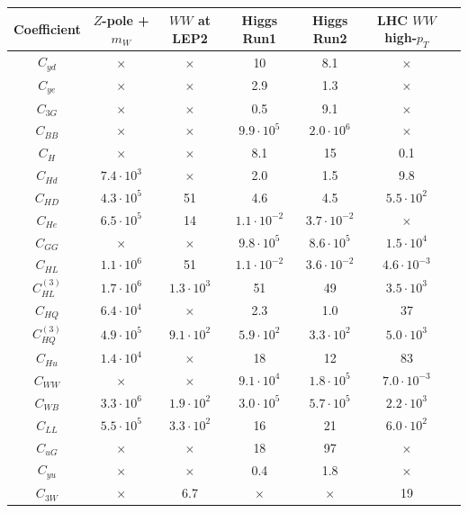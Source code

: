 \documentclass[../report.tex]{subfiles}
\begin{document}
\begin{table}
\centering
 \begin{tabular}{|c|c|c|c|c|c|c|} \hline
Coefficient & $Z$-pole + $m_W$ & $WW$ at LEP2 & Higgs Run1 & Higgs Run2 & LHC $WW$ high-$p_T$  \\  \hline \hline
 $C_{yd}$ & $\times$ & $\times$ & 10 & 8.1 & $\times$  \\
 $C_{ye}$ & $\times$ & $\times$ & 2.9 & 1.3 & $\times$ \\
 $C_{3G}$ & $\times$ & $\times$ & 0.5 & 9.1 & $\times$  \\
 $C_{BB}$ & $\times$ & $\times$ & $9.9 \cdot 10^5$ & $2.0 \cdot 10^6$ & $\times$  \\
 $C_{H}$ & $\times$ & $\times$ & 8.1 & 15 & 0.1  \\
$C_{Hd}$ & $7.4 \cdot 10^3$ & $\times$ & 2.0 & 1.5 & 9.8  \\
 $C_{HD}$ & $4.3 \cdot 10^5$ & 51 & 4.6 & 4.5 & $5.5 \cdot 10^2$  \\
$C_{He}$ & $6.5 \cdot 10^5$ & 14 & $1.1 \cdot 10^{-2}$ & $3.7 \cdot 10^{-2}$ & $\times$  \\
 $C_{GG}$ & $\times$ & $\times$ & $9.8 \cdot 10^5$ & $8.6 \cdot 10^5$ & $1.5 \cdot 10^4$  \\
$C_{HL}$ & $1.1 \cdot 10^6$ & 51 & $1.1 \cdot 10^{-2}$ & $3.6 \cdot 10^{-2}$ & $4.6 \cdot 10^{-3}$  \\
 $C_{HL}^{(3)}$ & $1.7 \cdot 10^6$ & $1.3 \cdot 10^3$ & 51 & 49 & $3.5 \cdot 10^3$  \\
 $C_{HQ}$ & $6.4 \cdot 10^4$ & $\times$ & 2.3 & 1.0 & 37  \\
$C_{HQ}^{(3)}$ & $4.9 \cdot 10^5$ & $9.1 \cdot 10^2$ & $5.9 \cdot 10^2$ & $3.3 \cdot 10^2$ & $5.0 \cdot 10^3$  \\
 $C_{Hu}$ & $1.4 \cdot 10^4$ & $\times$ & 18 & 12 & 83  \\
$C_{WW}$ & $\times$ & $\times$ & $9.1 \cdot 10^4$ & $1.8 \cdot 10^5$ & $7.0 \cdot 10^{-3}$ \\
$C_{WB}$ & $3.3 \cdot 10^6$ & $1.9 \cdot 10^2$ & $3.0 \cdot 10^5$ & $5.7 \cdot 10^5$ & $2.2 \cdot 10^3$ \\
 $C_{LL}$ & $5.5 \cdot 10^5$ & $3.3 \cdot 10^2$ & 16 & 21 & $6.0 \cdot 10^2$ \\
$C_{uG}$ & $\times$ & $\times$ & 18 & 97 & $\times$  \\
 $C_{yu}$ & $\times$ & $\times$ & 0.4 & 1.8 & $\times$ \\
 $C_{3W}$ & $\times$ & 6.7 & $\times$ & $\times$ & 19 \\ \hline

\end{tabular}
\end{table}
\end{document}
